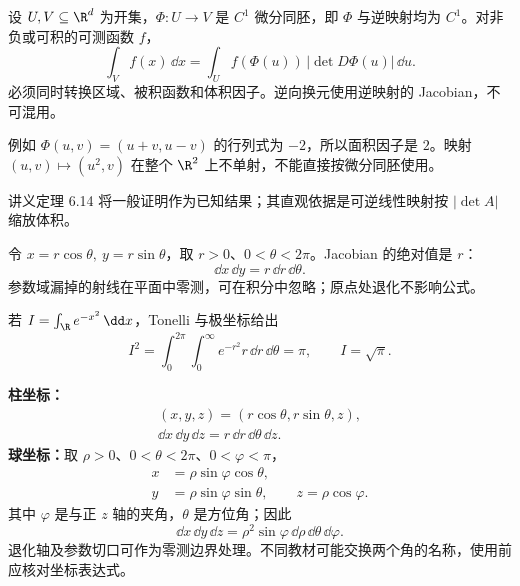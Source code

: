 设 $U,V\subseteq\R^d$ 为开集，$\Phi:U\to V$ 是 $C^1$ 微分同胚，即 $\Phi$ 与逆映射均为 $C^1$。对非负或可积的可测函数 $f$，
\[
\int_V f(x)\,\dd x
=\int_U f(\Phi(u))\,|\det D\Phi(u)|\,\dd u.
\]
必须同时转换区域、被积函数和体积因子。逆向换元使用逆映射的 Jacobian，不可混用。

例如 $\Phi(u,v)=(u+v,u-v)$ 的行列式为 $-2$，所以面积因子是 $2$。映射 $(u,v)\mapsto(u^2,v)$ 在整个 $\R^2$ 上不单射，不能直接按微分同胚使用。

讲义定理 6.14 将一般证明作为已知结果；其直观依据是可逆线性映射按 $|\det A|$ 缩放体积。

令 $x=r\cos\theta,\ y=r\sin\theta$，取 $r>0$、$0<\theta<2\pi$。Jacobian 的绝对值是 $r$：
\[
\dd x\,\dd y=r\,\dd r\,\dd\theta.
\]
参数域漏掉的射线在平面中零测，可在积分中忽略；原点处退化不影响公式。

若 $I=\int_{\R}e^{-x^2}\,\dd x$，Tonelli 与极坐标给出
\[
I^2=\int_0^{2\pi}\int_0^\infty e^{-r^2}r\,\dd r\,\dd\theta
=\pi,
\qquad I=\sqrt\pi.
\]

\textbf{柱坐标：}
\[
\begin{gathered}
(x,y,z)=(r\cos\theta,r\sin\theta,z),\\
\dd x\,\dd y\,\dd z=r\,\dd r\,\dd\theta\,\dd z.
\end{gathered}
\]
\textbf{球坐标：}取 $\rho>0$、$0<\theta<2\pi$、$0<\varphi<\pi$，
\[
\begin{aligned}
x&=\rho\sin\varphi\cos\theta,\\
y&=\rho\sin\varphi\sin\theta,\qquad z=\rho\cos\varphi.
\end{aligned}
\]
其中 $\varphi$ 是与正 $z$ 轴的夹角，$\theta$ 是方位角；因此
\[
\dd x\,\dd y\,\dd z
=\rho^2\sin\varphi\,\dd\rho\,\dd\theta\,\dd\varphi.
\]
退化轴及参数切口可作为零测边界处理。不同教材可能交换两个角的名称，使用前应核对坐标表达式。
